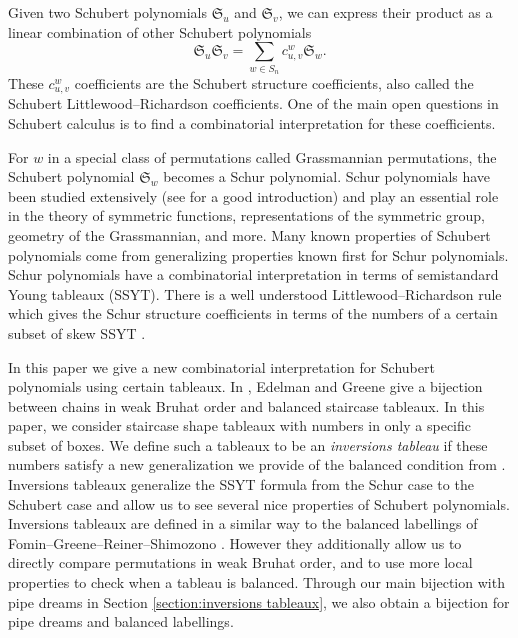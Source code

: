 \documentclass{article}
\theoremstyle{definition}
\begin{document}
Given two Schubert polynomials $\mathfrak{S}_u$ and $\mathfrak{S}_v$, we can express their product as a linear combination of other Schubert polynomials
    $$\mathfrak{S}_u \mathfrak{S}_v = \sum\limits_{w \in S_n} c^w_{u,v} \mathfrak{S}_w.$$
These $c^w_{u,v}$ coefficients are the Schubert structure coefficients, also called the Schubert Littlewood--Richardson coefficients. One of the main open questions in Schubert calculus is to find a combinatorial interpretation for these coefficients.

For $w$ in a special class of permutations called Grassmannian permutations, the Schubert polynomial $\mathfrak{S}_w$ becomes a Schur polynomial. 
Schur polynomials have been studied extensively (see \cite{EC2}  for a good introduction) and play an essential role in the theory of symmetric functions, representations of the symmetric group, geometry of the Grassmannian, and more. Many known properties of Schubert polynomials come from generalizing properties known first for Schur polynomials. Schur polynomials have a combinatorial interpretation in terms of semistandard Young tableaux (SSYT). There is a well understood Littlewood--Richardson rule which gives the Schur structure coefficients in terms of the numbers of a certain subset of skew SSYT \cite{littlewood1934group, stembridge2002concise}.

In this paper we give a new combinatorial interpretation for Schubert polynomials using certain tableaux. In \cite{EG}, Edelman and Greene give a bijection between chains in weak Bruhat order and balanced staircase tableaux. In this paper, we consider staircase shape tableaux with numbers in only a specific subset of boxes. We define such a tableaux to be an \emph{inversions tableau} if these numbers satisfy a new generalization we provide of the balanced condition from \cite{EG}. Inversions tableaux generalize the SSYT formula from the Schur case to the Schubert case and allow us to see several nice properties of Schubert polynomials. Inversions tableaux are defined in a similar way to the balanced labellings of Fomin--Greene--Reiner--Shimozono \cite{balancedlabellings}. However they additionally allow us to directly compare permutations in weak Bruhat order, and to use more local properties to check when a tableau is balanced. Through our main bijection with pipe dreams in Section \ref{section:inversions tableaux}, we also obtain a bijection for pipe dreams and balanced labellings.
\end{document}
